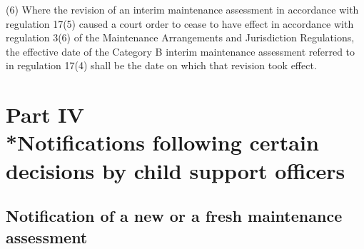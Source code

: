 \documentclass[a4paper,12pt]{article}
\begin{document}
(6) Where the revision of an interim maintenance assessment in accordance with regulation 17(5) caused a court order to cease to have effect in accordance with regulation 3(6) of the Maintenance Arrangements and Jurisdiction Regulations, the effective date of the Category B interim maintenance assessment referred to in regulation 17(4) shall be the date on which that revision took effect.



\section[Part IV --- Notifications following certain decisions by child support officers]{\sloppy Part IV\\*Notifications following certain decisions by child support officers}

\renewcommand\parthead{--- Part IV}

\subsection[10. Notification of a new or a fresh maintenance assessment]{Notification of a new or a fresh maintenance assessment}
\end{document}
